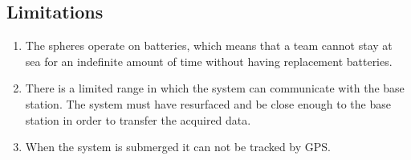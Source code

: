 \subsection{Limitations}
\begin{enumerate}
\item The spheres operate on batteries, which means that a team cannot stay at sea for an indefinite amount of time without having replacement batteries.

\item There is a limited range in which the system can communicate with the base station. The system must have resurfaced and be close enough to the base station in order to transfer the acquired data.

\item When the system is submerged it can not be tracked by GPS.

\end{enumerate}

